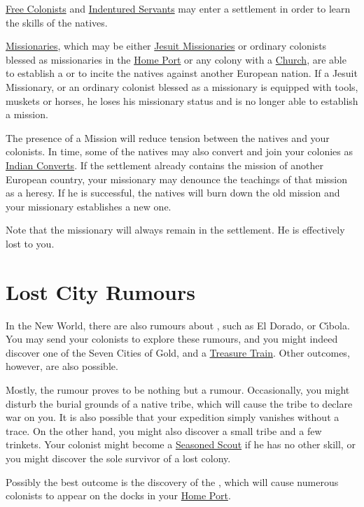 \documentclass[12pt]{book}
\begin{document}
\hyperlink{Free Colonist}{Free Colonists} and \hyperlink{Indentured 
Servant}{Indentured Servants} may enter a settlement in order to learn
the skills of the natives. 

\hyperlink{Missionary}{Missionaries}, which may be either
\hyperlink{Jesuit Missionary}{Jesuit Missionaries} or ordinary
colonists blessed as missionaries in the \hyperlink{Home Port}{Home
  Port} or any colony with a \hyperlink{Church}{Church}, are able to
establish a  or to incite the natives against another
European nation. If a Jesuit Missionary, or an ordinary colonist
blessed as a missionary is equipped with tools, muskets or horses, he
loses his missionary status and is no longer able to establish a
mission.

The presence of a Mission will reduce tension between the natives and
your colonists. In time, some of the natives may also convert and join
your colonies as \hyperlink{Indian Convert}{Indian Converts}. If the
settlement already contains the mission of another European country,
your missionary may denounce the teachings of that mission as a
heresy. If he is successful, the natives will burn down the old
mission and your missionary establishes a new one.

Note that the missionary will always remain in the settlement. He is
effectively lost to you.


\hypertarget{Lost City Rumours}{\section{Lost City Rumours}}

In the New World, there are also rumours about ,
such as El Dorado, or C{\'\i}bola. You may send your colonists to
explore these rumours, and you might indeed discover one of the Seven
Cities of Gold, and a \hyperlink{Treasure Train}{Treasure Train}.
Other outcomes, however, are also possible.

Mostly, the rumour proves to be nothing but a rumour. Occasionally,
you might disturb the burial grounds of a native tribe, which will
cause the tribe to declare war on you. It is also possible that your
expedition simply vanishes without a trace. On the other hand, you
might also discover a small tribe and a few trinkets. Your colonist
might become a \hyperlink{Seasoned Scout}{Seasoned Scout} if he has no
other skill, or you might discover the sole survivor of a lost
colony.

Possibly the best outcome is the discovery of the , which will cause numerous colonists to appear on the docks in
your \hyperlink{Home Port}{Home Port}.
\end{document}

